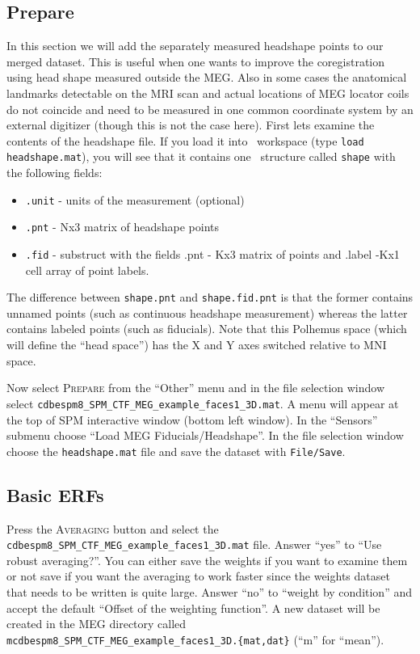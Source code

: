 \subsection{Prepare}

In this section we will add the separately measured headshape points to our merged dataset. This is useful when one wants to improve the coregistration using head shape measured outside the MEG. Also in some cases the anatomical landmarks detectable on the MRI scan and actual locations of MEG locator coils do not coincide and need to be measured in one common coordinate system by an external digitizer (though this is not the case here). First lets examine the contents of the headshape file. If you load it into \matlab\ workspace (type \texttt{load headshape.mat}), you will see that it contains one \matlab\ structure called \texttt{shape} with the following fields:
\begin{itemize}
\item \texttt{.unit} - units of the measurement (optional)
\item \texttt{.pnt} - Nx3 matrix of headshape points
\item \texttt{.fid} - substruct with the fields .pnt - Kx3 matrix of points and .label -Kx1 cell array of point labels.
\end{itemize}

The difference between \texttt{shape.pnt} and \texttt{shape.fid.pnt} is that the former contains unnamed points (such as continuous headshape measurement) whereas the latter contains labeled points (such as fiducials). Note that this Polhemus space (which will define the ``head space'') has the X and Y axes switched relative to MNI space.

Now select \textsc{Prepare} from the ``Other'' menu and in the file selection window select \texttt{cdbespm8\_\-SPM\_\-CTF\_\-MEG\_\-example\_\-faces1\_3D.mat}. A menu will appear at the top of SPM interactive window (bottom left window). In the ``Sensors'' submenu choose ``Load MEG Fiducials/Headshape''. In the file selection window choose the \texttt{headshape.mat} file and save the dataset with \texttt{File/Save}.

\subsection{Basic ERFs} 

Press the \textsc{Averaging} button and select the \texttt{cdbespm8\_SPM\_CTF\_MEG\_example\_faces1\_3D.mat} file. Answer ``yes'' to ``Use robust averaging?''. You can either save the weights if you want to examine them or not save if you want the averaging to work faster since the weights dataset that needs to be written is quite large. Answer ``no'' to ``weight by condition'' and accept the default ``Offset of the weighting function''. A new dataset will be created in the MEG directory called \texttt{mcdbespm8\_SPM\_CTF\_MEG\_example\_faces1\_3D.\{mat,dat\}} (``m'' for ``mean'').

